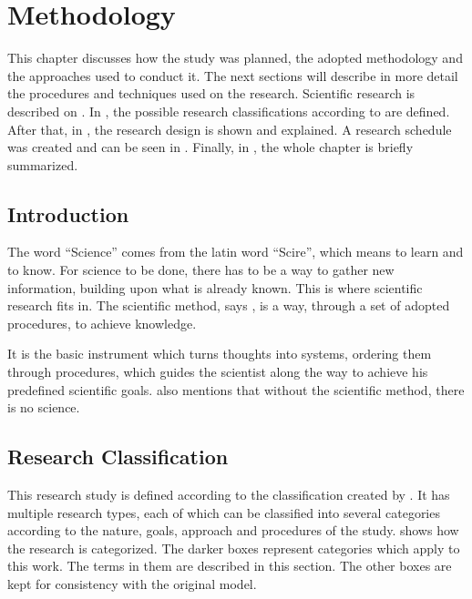 \chapter{Methodology}\label{methodology}

This chapter discusses how the study was planned, the adopted methodology and the approaches used to conduct it. The next sections will describe in more detail the procedures and techniques used on the research. Scientific research is described on . In , the possible research classifications according to \cite{Prodanov:2013} are defined. After that, in , the research design is shown and explained. A research schedule was created and can be seen in . Finally, in , the whole chapter is briefly summarized.

\section{Introduction}\label{sec:met-1}

The word ``Science'' comes from the latin word ``Scire'', which means to learn and to know. For science to be done, there has to be a way to gather new information, building upon what is already known. This is where scientific research fits in. The scientific method, says \cite{Prodanov:2013}, is a way, through a set of adopted procedures, to achieve knowledge.

It is the basic instrument which turns thoughts into systems, ordering them through procedures, which guides the scientist along the way to achieve his predefined scientific goals. \cite{Prodanov:2013} also mentions that without the scientific method, there is no science.

\section{Research Classification}\label{sec:met-2}

This research study is defined according to the classification created by \cite{Prodanov:2013}. It has multiple research types, each of which can be classified into several categories according to the nature, goals, approach and procedures of the study.  shows how the research is categorized. The darker boxes represent categories which apply to this work. The terms in them are described in this section. The other boxes are kept for consistency with the original model.

